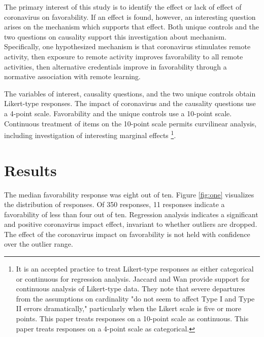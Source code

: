 \documentclass[review]{elsarticle}
\begin{document}
The primary interest of this study is to identify the effect or lack of effect of coronavirus on favorability.
If an effect is found, however, an interesting question arises on the mechanism which supports that effect.
Both unique controls and the two questions on causality support this investigation about mechanism.
Specifically, one hypothesized mechanism is that coronavirus stimulates remote activity,
then exposure to remote activity improves favorability to all remote activities,
then alternative credentials improve in favorability through a normative association with remote learning.

The variables of interest,
causality questions,
and the two unique controls obtain Likert-type responses.
The impact of coronavirus and the causality questions use a 4-point scale.
Favorability and the unique controls use a 10-point scale.
Continuous treatment of items on the 10-point scale permits curvilinear analysis,
including investigation of interesting marginal effects
\footnote{
    It is an accepted practice to treat Likert-type responses as either categorical or continuous for regression analysis.
    Jaccard and Wan provide support for continuous analysis of Likert-type data.
    They note that severe departures from the assumptions on cardinality "do not seem to affect Type I and Type II errors dramatically,"
    particularly when the Likert scale is five or more points\cite{jaccard1996lisrel}.
    This paper treats responses on a 10-point scale as continuous.
    This paper treats responses on a 4-point scale as categorical.
}.

\section{Results}

The median favorability response was eight out of ten.
Figure \ref{fig:one} visualizes the distribution of responses.
Of 350 responses, 11 responses indicate a favorability of less than four out of ten.
Regression analysis indicates a significant and positive coronavirus impact effect,
invariant to whether outliers are dropped.
The effect of the coronavirus impact on favorability
is not held with confidence over the outlier range.
\end{document}
